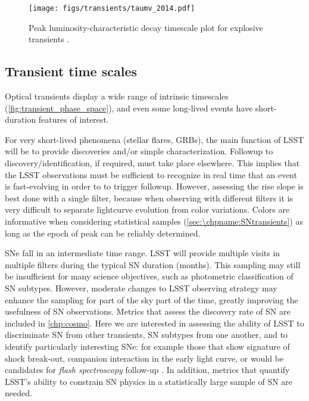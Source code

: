 \begin{figure}[hbt]
\centerline{
\texttt{[image: figs/transients/taumv\_2014.pdf]}
}
\caption{
Peak luminosity-characteristic decay timescale plot for explosive
transients \citep[adapted from][]{2011PhDT........35K}.
}
\label{fig:transient_phase_space}
\end{figure}





%




\subsection{Transient time scales}

Optical transients display a wide range of intrinsic timescales
(\autoref{fig:transient_phase_space}), and even some long-lived events
have short-duration features of interest.

For very short-lived phenomena (stellar flares, GRBs),
the main function of LSST will be to provide discoveries and/or simple
characterization.  Followup to discovery/identification, if required,
must take place elsewhere. This implies that the LSST observations
must be sufficient to recognize in real time that an event is fast-evolving
in order to to trigger followup. However, assessing the rise
slope is best done with a single filter, 
because when observing with different
filters it is very difficult to separate lightcurve evolution from
color variations. Colors are informative when considering statistical
samples (\autoref{sec:\chpname:SNtransients}) as long as the epoch of peak
can be reliably determined.

SNe fall in an intermediate time range.  LSST will provide
multiple visits in multiple filters during the typical SN duration
(months).  This sampling may still be insufficient for many science
objectives, such as photometric classification of SN subtypes.
However, moderate changes to LSST
observing strategy may enhance the sampling for part of the sky part
of the time, greatly improving the usefulness of SN observations.
Metrics that assess the discovery rate of SN are included in
\autoref{chp:cosmo}.
Here we are interested in assessing the ability of
LSST to discriminate SN from other transients, SN subtypes from one
another, and to identify particularly interesting SNe: for example
those that show signature of shock break-out, companion interaction
in the early light curve, or would be candidates for \emph{flash
spectroscopy} follow-up \citep[e.g.,][]{2014Natur.509..471G}.
In addition, metrics that
quantify LSST's ability to constrain SN physics in a statistically
large sample of SN are needed.

